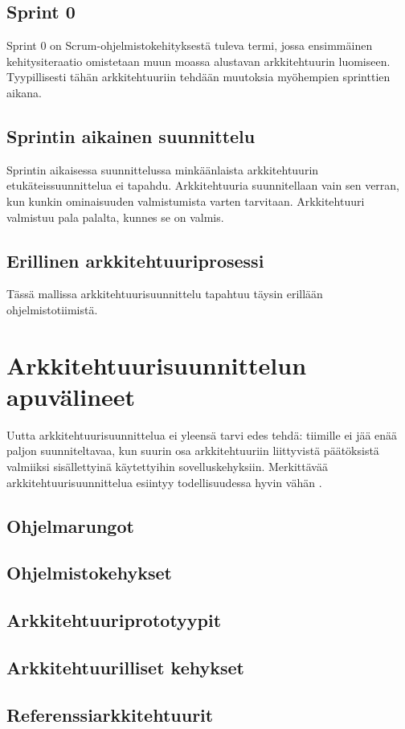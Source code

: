 \section{Sprint 0}
Sprint 0 on Scrum-ohjelmistokehityksestä tuleva termi, jossa ensimmäinen kehitysiteraatio omistetaan muun moassa alustavan arkkitehtuurin luomiseen. Tyypillisesti tähän arkkitehtuuriin tehdään muutoksia myöhempien sprinttien aikana.

\section{Sprintin aikainen suunnittelu}
Sprintin aikaisessa suunnittelussa minkäänlaista arkkitehtuurin etukäteissuunnittelua ei tapahdu. Arkkitehtuuria suunnitellaan vain sen verran, kun kunkin ominaisuuden  valmistumista varten tarvitaan. Arkkitehtuuri valmistuu pala palalta, kunnes se on valmis.

\section{Erillinen arkkitehtuuriprosessi}
Tässä mallissa arkkitehtuurisuunnittelu tapahtuu täysin erillään ohjelmistotiimistä.

\chapter{Arkkitehtuurisuunnittelun apuvälineet}
Uutta arkkitehtuurisuunnittelua ei yleensä tarvi edes tehdä: tiimille ei jää enää paljon suunniteltavaa, kun suurin osa arkkitehtuuriin liittyvistä päätöksistä valmiiksi sisällettyinä käytettyihin sovelluskehyksiin. Merkittävää arkkitehtuurisuunnittelua esiintyy todellisuudessa hyvin vähän \citep{bellomo2014agilely}.
\section{Ohjelmarungot}
\section{Ohjelmistokehykset}
\section{Arkkitehtuuriprototyypit}
\section{Arkkitehtuurilliset kehykset}
\section{Referenssiarkkitehtuurit}


